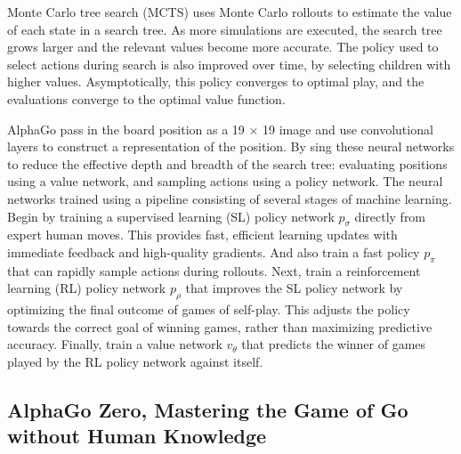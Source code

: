 \documentclass[12pt,a4paper]{article}
\begin{document}
{\hspace{0cm} Monte Carlo tree search (MCTS)\cite{CoulomMCTS}\cite{KocsisMCTS} uses Monte Carlo rollouts to estimate the value of each state in a search tree. As more simulations are executed, the search tree grows larger and the relevant values become more accurate. The policy used to select actions during search is also improved over time, by selecting children with higher values. Asymptotically, this policy converges to optimal play, and the evaluations converge to the optimal value function\cite{KocsisMCTS}. \par
AlphaGo pass in the board position as a 19 × 19 image and use convolutional layers to construct a representation of the position. By sing these neural networks to reduce the effective depth and breadth of the search tree: evaluating positions using a value network, and sampling actions using a policy network. The neural networks trained using a pipeline consisting of several stages of machine learning. Begin by training a supervised learning (SL) policy network \(p_\sigma\) directly from expert human moves. This provides fast, efficient learning updates with immediate feedback and high-quality gradients. And also train a fast policy \(p_\pi\) that can rapidly sample actions during rollouts. Next, train a reinforcement learning (RL) policy network \(p_\rho\) that improves the SL policy network by optimizing the final outcome of games of self-play. This adjusts the policy towards the correct goal of winning games, rather than maximizing predictive accuracy. Finally, train a value network \(v_\theta\) that predicts the winner of games played by the RL policy network against itself.\par
}
\subsection{AlphaGo Zero, Mastering the Game of Go without Human Knowledge}
\end{document}
